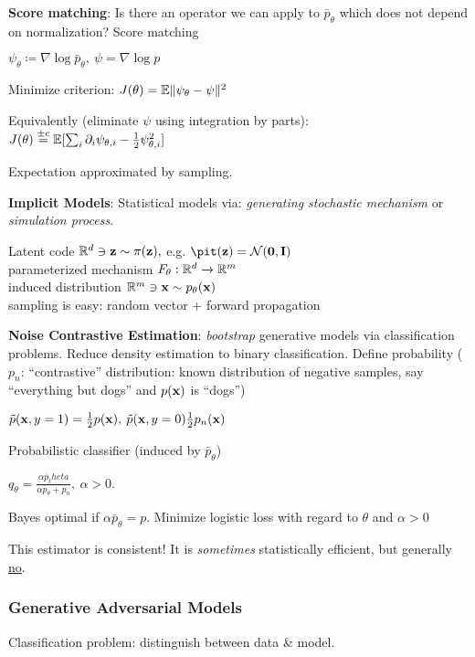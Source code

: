 \textbf{Score matching}: Is there an operator we can apply to $\bar{p}_\theta$ which does not depend on normalization? Score matching

\tab $\psi_\theta\coloneqq\nabla\log \bar{p}_\theta,\> \psi=\nabla \log p$

Minimize criterion: $J(\theta)=\mathbb E \lVert \psi_\theta - \psi \rVert^2$

Equivalently (eliminate $\psi$ using integration by parts):\\
\tab$J(\theta) \overset{\pm c}{=} \mathbb E \lbrack \sum_i \partial_i \psi_{\theta,i}-\frac{1}{2}\psi^2_{\theta,i}\rbrack$

Expectation approximated by sampling.

\textbf{Implicit Models}: Statistical models via: \emph{generating stochastic mechanism} or \emph{simulation process}.

\tab Latent code $\mathbb R^d\ni\mathbf z\sim\pi(\mathbf z),$ e.g. $\pit(\vz)=\cN(\mathbf{0},\vI)$\\
\tab parameterized mechanism $F_\theta: \mathbb R^d\xrightarrow{}\mathbb R^m$\\
\tab induced distribution $\mathbb R^m \ni \mathbf x\sim p_\theta(\mathbf x)$\\
\tab sampling is easy: random vector + forward propagation

\textbf{Noise Contrastive Estimation}: \emph{bootstrap} generative models via classification problems. Reduce density estimation to binary classification. Define probability ($p_n$: ``contrastive'' distribution: known distribution of negative samples, say ``everything but dogs'' and $p(\mathbf x)$ is ``dogs'')

\tab $\Tilde{p} (\mathbf x,y=1)=\frac{1}{2}p(\mathbf x),\> \Tilde{p}(\mathbf x,y=0)\frac{1}{2}p_n(\mathbf x)$

Probabilistic classifier (induced by $\bar{p}_\theta$)

\tab $q_\theta = \frac{\alpha \bar{p}_theta}{\alpha \bar{p}_\theta + p_n},\> \alpha>0$.

Bayes optimal if $\alpha\bar{p}_\theta=p$. Minimize logistic loss with regard to $\theta$ and $\alpha>0$

This estimator is consistent! It is \emph{sometimes} statistically efficient, but generally \underline{no}.

\subsubsection{Generative Adversarial Models}
\label{ssub:gams}

Classification problem: distinguish between data \& model.

